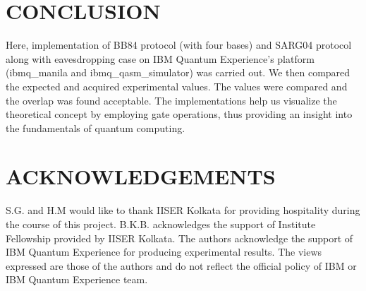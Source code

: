 \documentclass[superscriptaddress,twocolumn,showpacs,prb,floatfix]{revtex4}
\begin{document}
\section{CONCLUSION}
\label{SecIV}

Here, implementation of BB84 protocol (with four bases) and SARG04 protocol along with eavesdropping case on IBM Quantum Experience's platform (ibmq\_manila and ibmq\_qasm\_simulator) was carried out. We then compared the expected and acquired experimental values. The values were compared and the overlap was found acceptable. The implementations help us visualize the theoretical concept by employing gate operations, thus providing an insight into the fundamentals of quantum computing.

\section{ACKNOWLEDGEMENTS}
\label{SecV}
S.G. and H.M would like to thank IISER Kolkata for providing hospitality during the course of this project. B.K.B. acknowledges the support of Institute Fellowship provided by IISER Kolkata. The authors acknowledge the support of IBM Quantum Experience for producing experimental results. The views expressed are those of the authors and do not reflect the official policy of IBM or IBM Quantum Experience team.
\end{document}
